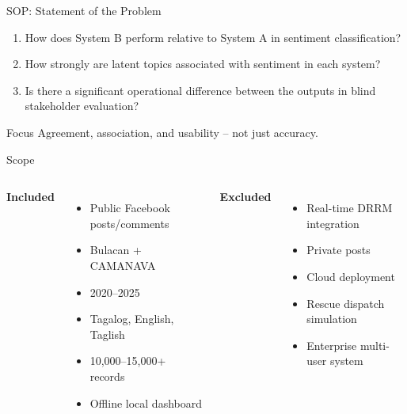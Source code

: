 \documentclass[aspectratio=169,10pt]{beamer}
\begin{document}
	
	\begin{frame}{SOP: Statement of the Problem}
		
		\begin{enumerate}
			\item How does System B perform relative to System A in sentiment classification?
			\item How strongly are latent topics associated with sentiment in each system?
			\item Is there a significant operational difference between the outputs in blind stakeholder evaluation?
		\end{enumerate}
		
		\vspace{1mm}
		
		\begin{block}{Focus}
			Agreement, association, and usability -- not just accuracy.
		\end{block}
		
	\end{frame}
	
	
	\begin{frame}{Scope}
		
		\begin{columns}[T]
			
			
			\textbf{Included}
			\begin{itemize}
				\item Public Facebook posts/comments
				\item Bulacan + CAMANAVA
				\item 2020--2025
				\item Tagalog, English, Taglish
				\item 10,000--15,000+ records
				\item Offline local dashboard
			\end{itemize}
			
			
			\textbf{Excluded}
			\begin{itemize}
				\item Real-time DRRM integration
				\item Private posts
				\item Cloud deployment
				\item Rescue dispatch simulation
				\item Enterprise multi-user system
			\end{itemize}
			
		\end{columns}
		
	\end{frame}
	
\end{document}
